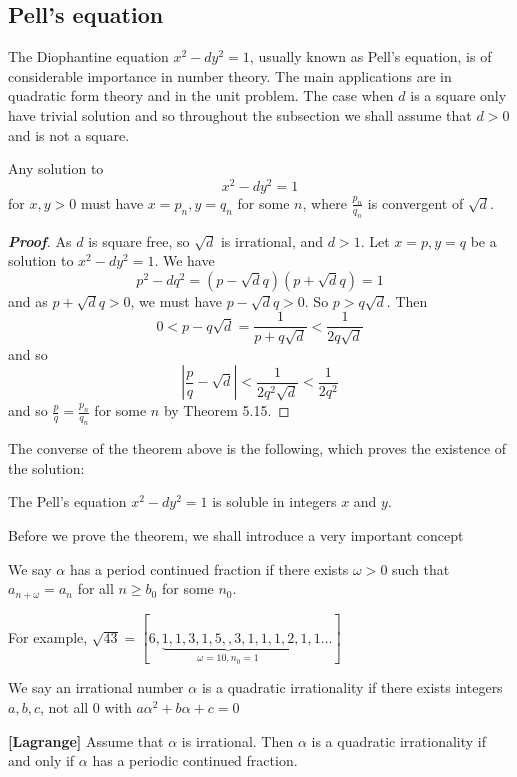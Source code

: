 \subsection{Pell's equation}
The Diophantine equation $x^2-dy^2=1$, usually known as Pell's equation, is of considerable importance in number theory. The main applications are in quadratic form theory and in the unit problem. The case when $d$ is a square only have trivial solution and so throughout the subsection we shall assume that $d>0$
and is not a square.
\begin{theorem} Any solution to
$$x^2-dy^2=1$$
for $x,y>0$ must have $x=p_n,y=q_n$ for some $n$, where $\frac{p_n}{q_n}$ is convergent of $\sqrt{d}$.
\end{theorem}
\begin{proof}[\bf Proof] As $d$ is square free, so $\sqrt{d}$ is irrational, and $d>1$.
Let $x=p,y=q$ be a solution to $x^2-dy^2=1$. We have
$$p^2-dq^2=(p-\sqrt{d}q)(p+\sqrt{d}q)=1$$
and as $p+\sqrt{d}q>0$, we must have $p-\sqrt{d}q>0$. So $p>q\sqrt{d}$.
Then
$$0<p-q\sqrt{d}=\frac{1}{p+q\sqrt{d}}<\frac{1}{2q\sqrt{d}}$$
and so
$$\left|\frac{p}{q}-\sqrt{d}\right|<\frac{1}{2q^2 \sqrt{d}} <\frac{1}{2q^2}$$
and so $\frac{p}{q}=\frac{p_n}{q_n}$ for some $n$ by Theorem 5.15.
\end{proof}
The converse of the theorem above is the following, which proves the existence of the solution:
\begin{theorem} The Pell's equation $x^2-dy^2=1$ is soluble in integers $x$ and $y$.
\end{theorem}
Before we prove the theorem, we shall introduce a very important concept
\begin{definition} We say $\alpha$ has a period continued fraction if there exists $\omega>0$ such that
$a_{n+\omega}=a_n$ for all $n \ge b_0$ for some $n_0$.
\end{definition}
For example, $\sqrt{43}=[6,\underbrace{1,1,3,1,5,,3,1,1,1,2}_{\omega=10,n_0=1},1,1\ldots]$
\begin{definition} We say an irrational number $\alpha$ is a quadratic irrationality if there exists integers $a,b,c$, not all $0$ with $a\alpha^2+b\alpha+c=0$
\end{definition}
\begin{theorem}{\bf [Lagrange]}\label{L;Lagrange continued fraction} Assume that
$\alpha$ is irrational. Then $\alpha$ is a quadratic irrationality if and only if $\alpha$ has a periodic continued fraction.
\end{theorem}

